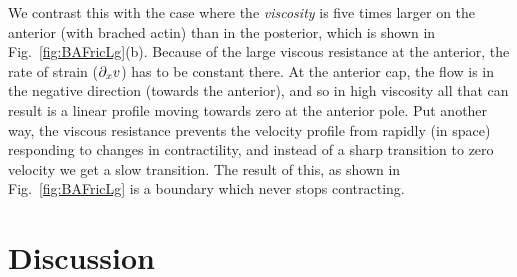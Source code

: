\documentclass[11pt]{article}
\newcommand{\6}[1]{#1_{\text{6}}}
\newcommand{\3}[1]{#1_{\text{3}}}
\begin{document}
We contrast this with the case where the \emph{viscosity} is five times larger on the anterior (with brached actin) than in the posterior, which is shown in Fig.\ \ref{fig:BAFricLg}(b). Because of the large viscous resistance at the anterior, the rate of strain ($\partial_x v$) has to be constant there. At the anterior cap, the flow is in the negative direction (towards the anterior), and so in high viscosity all that can result is a linear profile moving towards zero at the anterior pole. Put another way, the viscous resistance prevents the velocity profile from rapidly (in space) responding to changes in contractility, and instead of a sharp transition to zero velocity we get a slow transition. The result of this, as shown in Fig.\ \ref{fig:BAFricLg} is a boundary which never stops contracting.

\section{Discussion}






\end{document}
